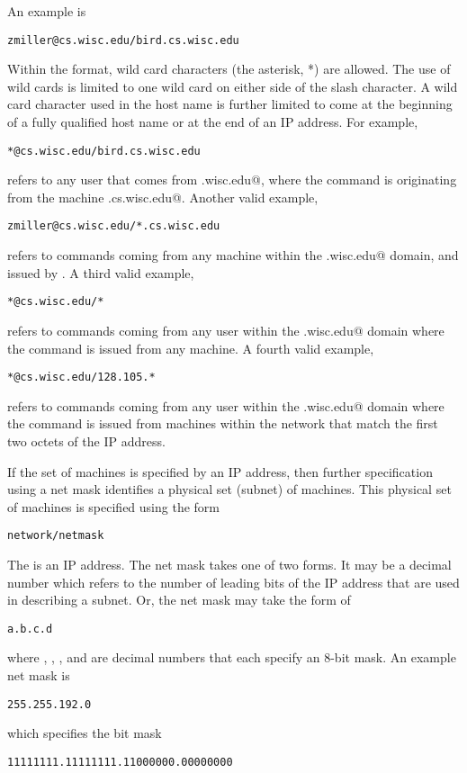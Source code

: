 An example is
\begin{verbatim}
zmiller@cs.wisc.edu/bird.cs.wisc.edu
\end{verbatim}

Within the format, wild card characters (the asterisk, *) are allowed.
The use of wild cards is limited to one wild card on either side
of the slash character.
A wild card character used in the host name is further limited
to come at the beginning of a fully qualified host name
or at the end of an IP address.
For example,
\begin{verbatim}
*@cs.wisc.edu/bird.cs.wisc.edu
\end{verbatim}
refers to any user that comes from \verb@cs.wisc.edu@,
where the command is originating from the machine
\verb@bird.cs.wisc.edu@.
Another valid example,
\begin{verbatim}
zmiller@cs.wisc.edu/*.cs.wisc.edu
\end{verbatim}
refers to commands coming from any machine within the 
\verb@cs.wisc.edu@ domain, and issued by \verb@zmiller@.
A third valid example,
\begin{verbatim}
*@cs.wisc.edu/*
\end{verbatim}
refers to commands coming from any user within the 
\verb@cs.wisc.edu@ domain
where the command is issued from any machine.
A fourth valid example,
\begin{verbatim}
*@cs.wisc.edu/128.105.*
\end{verbatim}
refers to commands coming from any user within the 
\verb@cs.wisc.edu@ domain
where the command is issued from machines within the network that match
the first two octets of the IP address.

If the set of machines is specified by an IP address,
then further specification using a net mask
identifies a physical set (subnet) of machines.
This physical set of machines is specified using the form
\begin{verbatim}
network/netmask
\end{verbatim}
The \verb@network@ is an IP address.
The net mask takes one of two forms.
It may be a decimal number which refers to the number of leading
bits of the IP address that are used in describing a subnet.
Or, the net mask may take the form of
\begin{verbatim}
a.b.c.d
\end{verbatim}
where \verb@a@,
\verb@b@,
\verb@c@, and
\verb@d@
are decimal numbers that each specify an 8-bit mask.
An example net mask is
\begin{verbatim}
255.255.192.0
\end{verbatim}
which specifies the bit mask
\begin{verbatim}
11111111.11111111.11000000.00000000
\end{verbatim}

